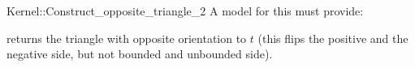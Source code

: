 \begin{ccRefFunctionObjectConcept}{Kernel::Construct_opposite_triangle_2}
A model for this must provide:


       {returns the triangle with opposite orientation to $t$
        (this flips the positive and the negative side, but
        not bounded and unbounded side).}

\ccIsModel{}

\end{ccRefFunctionObjectConcept}
